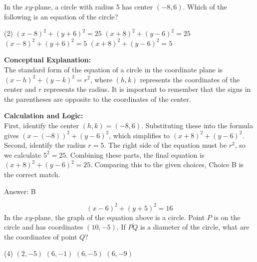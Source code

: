 \documentclass[11pt,paper=a4,answers]{exam}
\begin{document}
\begin{questions}
\pointsinrightmargin
\pointsdroppedatright
\marksnotpoints
{}
\pointformat{\boldmath\themarginpoints}
\bracketedpoints



\question
In the $xy$-plane, a circle with radius 5 has center $(-8, 6)$. Which of the following is an equation of the circle?
\begin{tasks}(2)
    \task $(x - 8)^2 + (y + 6)^2 = 25$
    \task $(x + 8)^2 + (y - 6)^2 = 25$
    \task $(x - 8)^2 + (y + 6)^2 = 5$
    \task $(x + 8)^2 + (y - 6)^2 = 5$
\end{tasks}

\begin{solution}
\textbf{Conceptual Explanation:} \\
The standard form of the equation of a circle in the coordinate plane is $(x - h)^2 + (y - k)^2 = r^2$, where $(h, k)$ represents the coordinates of the center and $r$ represents the radius. It is important to remember that the signs in the parentheses are opposite to the coordinates of the center.

\vspace{30pt}

\textbf{Calculation and Logic:} \\
First, identify the center $(h, k) = (-8, 6)$. Substituting these into the formula gives $(x - (-8))^2 + (y - 6)^2$, which simplifies to $(x + 8)^2 + (y - 6)^2$. Second, identify the radius $r = 5$. The right side of the equation must be $r^2$, so we calculate $5^2 = 25$. Combining these parts, the final equation is $(x + 8)^2 + (y - 6)^2 = 25$. Comparing this to the given choices, Choice B is the correct match.

\vspace{30pt}

Answer: \colorbox{yellow!100}{B}
\end{solution}

\vspace{60pt}

\question
$$(x - 6)^2 + (y + 5)^2 = 16$$
In the $xy$-plane, the graph of the equation above is a circle. Point $P$ is on the circle and has coordinates $(10, -5)$. If $\overline{PQ}$ is a diameter of the circle, what are the coordinates of point $Q$?
\begin{tasks}(4)
    \task $(2, -5)$
    \task $(6, -1)$
    \task $(6, -5)$
    \task $(6, -9)$
\end{tasks}


\end{questions}
\end{document}

